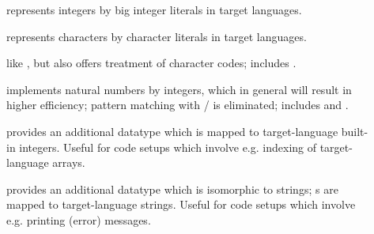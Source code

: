 \begin{isabellebody}
\begin{isamarkuptext}
\begin{description}
    \item[\hyperlink{theory.Code-Integer}{\mbox{}}] represents  integers by big
       integer literals in target languages.
    \item[\hyperlink{theory.Code-Char}{\mbox{}}] represents  characters by 
       character literals in target languages.
    \item[\hyperlink{theory.Code-Char-chr}{\mbox{}}] like ,
       but also offers treatment of character codes; includes
       \hyperlink{theory.Code-Char}{\mbox{}}.
    \item[\hyperlink{theory.Efficient-Nat}{\mbox{}}] \label{eff_nat} implements natural numbers by integers,
       which in general will result in higher efficiency; pattern
       matching with  / 
       is eliminated;  includes \hyperlink{theory.Code-Integer}{\mbox{}}
       and \hyperlink{theory.Code-Index}{\mbox{}}.
    \item[\hyperlink{theory.Code-Index}{\mbox{}}] provides an additional datatype
        which is mapped to target-language built-in integers.
       Useful for code setups which involve e.g. indexing of
       target-language arrays.
    \item[\hyperlink{theory.Code-Message}{\mbox{}}] provides an additional datatype
        which is isomorphic to strings;
       s are mapped to target-language strings.
       Useful for code setups which involve e.g. printing (error) messages.

  \end{description}


\end{isamarkuptext}
\end{isabellebody}
